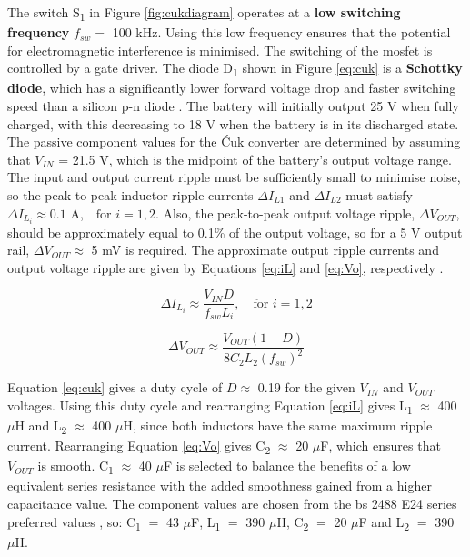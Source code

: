 The switch S\textsubscript{1} in Figure \ref{fig:cukdiagram} operates at a \textbf{low switching frequency} $f_{sw} =$ 100 kHz. Using this low frequency ensures that the potential for electromagnetic interference is minimised. The switching of the \acrshort{mosfet} is controlled by a gate driver. The diode D\textsubscript{1} shown in Figure \ref{eq:cuk} is a \textbf{Schottky diode}, which has a significantly lower forward voltage drop and faster switching speed than a silicon p-n diode \cite{Schottky}. The battery will initially output 25 V when fully charged, with this decreasing to 18 V when the battery is in its discharged state. The passive component values for the Ćuk converter are determined by assuming that $V_{IN}$ = 21.5 V, which is the midpoint of the battery's output voltage range. The input and output current ripple must be sufficiently small to minimise noise, so the peak-to-peak inductor ripple currents $\Delta I_{L1}$ and $\Delta I_{L2}$ must satisfy $\Delta I_{L_{i}} \approx 0.1$ A,$\quad \text{for } i = 1, 2$. Also, the peak-to-peak output voltage ripple, $\Delta V_{OUT}$, should be approximately equal to 0.1\% of the output voltage, so for a 5 V output rail,  $\Delta V_{OUT} \approx $ 5 mV is required. The approximate output ripple currents and output voltage ripple are given by Equations \ref{eq:iL} and \ref{eq:Vo}, respectively \cite{EricksonRobertW2020FoPE}.

\begin{equation}
\Delta I_{L_{i}} \approx \frac{ V_{IN} D}{ f_{sw} L_i}, \quad \text{for } i = 1, 2
\label{eq:iL}
\end{equation}

\begin{equation}
\Delta V_{OUT} \approx \frac{V_{OUT} (1 - D)}{8C_2 L_2 (f_{sw})^2}
\label{eq:Vo}
\end{equation}


Equation \ref{eq:cuk} gives a duty cycle of $D \approx$ 0.19 for the given $V_{IN}$ and $V_{OUT}$ voltages. Using this duty cycle and rearranging Equation \ref{eq:iL} gives L\textsubscript{1} $\approx$ 400 $\mu$H and L\textsubscript{2} $\approx$ 400 $\mu$H, since both inductors have the same maximum ripple current. Rearranging Equation \ref{eq:Vo} gives C\textsubscript{2} $\approx$ 20 $\mu$F, which ensures that $V_{OUT}$ is smooth. C\textsubscript{1} $\approx$ 40 $\mu$F is selected to balance the benefits of a low equivalent series resistance with the added smoothness gained from a higher capacitance value.  The component values are chosen from the \acrshort{bs} 2488 E24 series preferred values \cite{HLT}, so: C\textsubscript{1} $=$ 43 $\mu$F, L\textsubscript{1} $=$ 390 $\mu$H, C\textsubscript{2} $=$ 20 $\mu$F and  L\textsubscript{2} $=$ 390 $\mu$H. 

